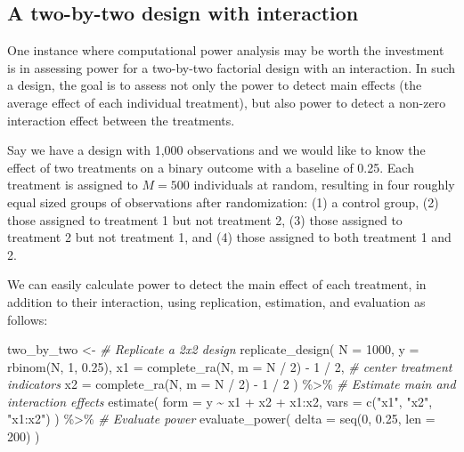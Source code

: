 \documentclass[
  12pt,
]{book}
\newenvironment{Shaded}{\begin{snugshade}}{\end{snugshade}}
\newcommand{\AttributeTok}[1]{\textcolor[rgb]{0.77,0.63,0.00}{#1}}
\newcommand{\CommentTok}[1]{\textcolor[rgb]{0.56,0.35,0.01}{\textit{#1}}}
\newcommand{\DecValTok}[1]{\textcolor[rgb]{0.00,0.00,0.81}{#1}}
\newcommand{\FloatTok}[1]{\textcolor[rgb]{0.00,0.00,0.81}{#1}}
\newcommand{\FunctionTok}[1]{\textcolor[rgb]{0.00,0.00,0.00}{#1}}
\newcommand{\NormalTok}[1]{#1}
\newcommand{\OtherTok}[1]{\textcolor[rgb]{0.56,0.35,0.01}{#1}}
\newcommand{\SpecialCharTok}[1]{\textcolor[rgb]{0.00,0.00,0.00}{#1}}
\newcommand{\StringTok}[1]{\textcolor[rgb]{0.31,0.60,0.02}{#1}}
\theoremstyle{definition}
\theoremstyle{definition}
\theoremstyle{definition}
\theoremstyle{remark}
\begin{document}
\hypertarget{a-two-by-two-design-with-interaction}{%
\subsection{A two-by-two design with
interaction}\label{a-two-by-two-design-with-interaction}}

One instance where computational power analysis may be worth the
investment is in assessing power for a two-by-two factorial design with
an interaction. In such a design, the goal is to assess not only the
power to detect main effects (the average effect of each individual
treatment), but also power to detect a non-zero interaction effect
between the treatments.

Say we have a design with 1,000 observations and we would like to know
the effect of two treatments on a binary outcome with a baseline of
0.25. Each treatment is assigned to \(M = 500\) individuals at random,
resulting in four roughly equal sized groups of observations after
randomization: (1) a control group, (2) those assigned to treatment 1
but not treatment 2, (3) those assigned to treatment 2 but not treatment
1, and (4) those assigned to both treatment 1 and 2.

We can easily calculate power to detect the main effect of each
treatment, in addition to their interaction, using replication,
estimation, and evaluation as follows:

\begin{Shaded}
\begin{Highlighting}[]
\NormalTok{two\_by\_two }\OtherTok{\textless{}{-}}
  \CommentTok{\# Replicate a 2x2 design}
  \FunctionTok{replicate\_design}\NormalTok{(}
    \AttributeTok{N =} \DecValTok{1000}\NormalTok{,}
    \AttributeTok{y =} \FunctionTok{rbinom}\NormalTok{(N, }\DecValTok{1}\NormalTok{, }\FloatTok{0.25}\NormalTok{),}
    \AttributeTok{x1 =} \FunctionTok{complete\_ra}\NormalTok{(N, }\AttributeTok{m =}\NormalTok{ N }\SpecialCharTok{/} \DecValTok{2}\NormalTok{) }\SpecialCharTok{{-}} \DecValTok{1} \SpecialCharTok{/} \DecValTok{2}\NormalTok{, }\CommentTok{\# center treatment indicators}
    \AttributeTok{x2 =} \FunctionTok{complete\_ra}\NormalTok{(N, }\AttributeTok{m =}\NormalTok{ N }\SpecialCharTok{/} \DecValTok{2}\NormalTok{) }\SpecialCharTok{{-}} \DecValTok{1} \SpecialCharTok{/} \DecValTok{2}
\NormalTok{  ) }\SpecialCharTok{\%\textgreater{}\%}
  \CommentTok{\# Estimate main and interaction effects}
  \FunctionTok{estimate}\NormalTok{(}
    \AttributeTok{form =}\NormalTok{ y }\SpecialCharTok{\textasciitilde{}}\NormalTok{ x1 }\SpecialCharTok{+}\NormalTok{ x2 }\SpecialCharTok{+}\NormalTok{ x1}\SpecialCharTok{:}\NormalTok{x2,}
    \AttributeTok{vars =} \FunctionTok{c}\NormalTok{(}\StringTok{"x1"}\NormalTok{, }\StringTok{"x2"}\NormalTok{, }\StringTok{"x1:x2"}\NormalTok{)}
\NormalTok{  ) }\SpecialCharTok{\%\textgreater{}\%}
  \CommentTok{\# Evaluate power}
  \FunctionTok{evaluate\_power}\NormalTok{(}
    \AttributeTok{delta =} \FunctionTok{seq}\NormalTok{(}\DecValTok{0}\NormalTok{, }\FloatTok{0.25}\NormalTok{, }\AttributeTok{len =} \DecValTok{200}\NormalTok{)}
\NormalTok{  )}
\end{Highlighting}
\end{Shaded}
\end{document}
